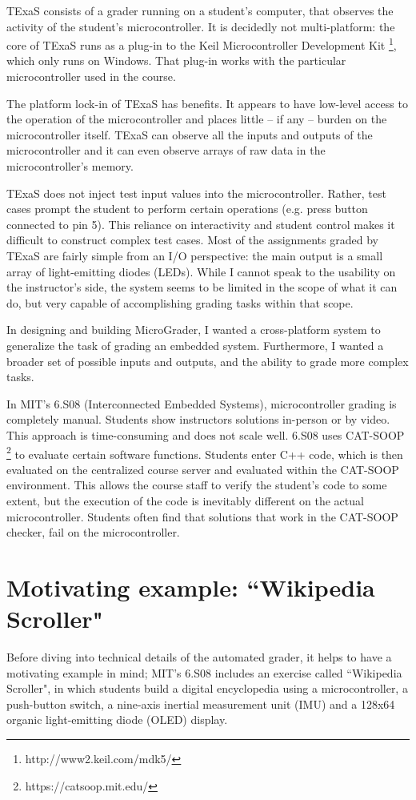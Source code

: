 \documentclass[12pt]{article}
\begin{document}
TExaS consists of a grader running on a student's computer, that observes the activity of the student's microcontroller.  It is decidedly not multi-platform: the core of TExaS runs as a plug-in to the Keil Microcontroller Development Kit \footnote{http://www2.keil.com/mdk5/}, which only runs on Windows.  That plug-in works with the particular microcontroller used in the course.

The platform lock-in of TExaS has benefits.  It appears to have low-level access to the operation of the microcontroller and places little -- if any -- burden on the microcontroller itself.  TExaS can observe all the inputs and outputs of the microcontroller and it can even observe arrays of raw data in the microcontroller's memory.

TExaS does not inject test input values into the microcontroller.  Rather, test cases prompt the student to perform certain operations (e.g. press button connected to pin 5).  This reliance on interactivity and student control makes it difficult to construct complex test cases.  Most of the assignments graded by TExaS are fairly simple from an I/O perspective: the main output is a small array of light-emitting diodes (LEDs).  While I cannot speak to the usability on the instructor's side, the system seems to be limited in the scope of what it can do, but very capable of accomplishing grading tasks within that scope.

In designing and building MicroGrader, I wanted a cross-platform system to generalize the task of grading an embedded system.  Furthermore, I wanted a broader set of possible inputs and outputs, and the ability to grade more complex tasks.

In MIT's 6.S08 (Interconnected Embedded Systems), microcontroller grading is completely manual.  Students show instructors solutions in-person or by video.  This approach is time-consuming and does not scale well.  6.S08 uses CAT-SOOP \footnote{https://catsoop.mit.edu/} to evaluate certain software functions.  Students enter C++ code, which is then evaluated on the centralized course server and evaluated within the CAT-SOOP environment.  This allows the course staff to verify the student's code to some extent, but the execution of the code is inevitably different on the actual microcontroller.  Students often find that solutions that work in the CAT-SOOP checker, fail on the microcontroller.

\newpage
\section{Motivating example: ``Wikipedia Scroller"}
\label{sec:wiki-scroller}
Before diving into technical details of the automated grader, it helps to have a motivating example in mind;  MIT's 6.S08 includes an exercise called ``Wikipedia Scroller", in which students build a digital encyclopedia using a microcontroller, a push-button switch, a nine-axis inertial measurement unit (IMU) and a 128x64 organic light-emitting diode (OLED) display.
\end{document}
